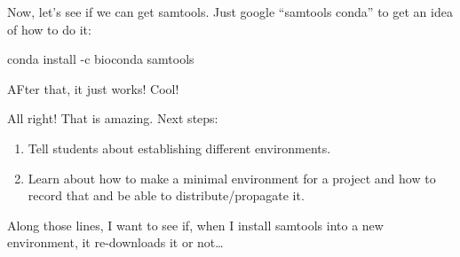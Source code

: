 \documentclass[]{krantz}
\makeatletter
\newenvironment{Shaded}{\begin{snugshade}}{\end{snugshade}}
\newcommand{\ExtensionTok}[1]{#1}
\newcommand{\KeywordTok}[1]{\textcolor[rgb]{0.27,0.27,0.27}{\textbf{#1}}}
\newcommand{\NormalTok}[1]{#1}
\newcommand{\OperatorTok}[1]{\textcolor[rgb]{0.43,0.43,0.43}{\textbf{#1}}}
\providecommand{\tightlist}{%
  \setlength{\itemsep}{0pt}\setlength{\parskip}{0pt}}
\newenvironment{kframe}{%
\medskip{}
\setlength{\fboxsep}{.8em}
 \def\at@end@of@kframe{}%
 \ifinner\ifhmode%
  \def\at@end@of@kframe{\end{minipage}}%
  \begin{minipage}{\columnwidth}%
 \fi\fi%
 \def\FrameCommand##1{\hskip\@totalleftmargin \hskip-\fboxsep
 \colorbox{shadecolor}{##1}\hskip-\fboxsep
     \hskip-\linewidth \hskip-\@totalleftmargin \hskip\columnwidth}%
 \MakeFramed {\advance\hsize-\width
   \@totalleftmargin\z@ \linewidth\hsize
   \@setminipage}}%
 {\par\unskip\endMakeFramed%
 \at@end@of@kframe}
\renewenvironment{Shaded}{\begin{kframe}}{\end{kframe}}
\makeatother
\begin{document}
Now, let's see if we can get samtools. Just google ``samtools conda'' to
get an idea of how to do it:

\begin{Shaded}
\begin{Highlighting}[]
\ExtensionTok{conda}\NormalTok{ install -c bioconda samtools}
\end{Highlighting}
\end{Shaded}

AFter that, it just works! Cool!

\begin{Shaded}
\end{Shaded}

All right! That is amazing. Next steps:

\begin{enumerate}
\def\labelenumi{\arabic{enumi}.}
\tightlist
\item
  Tell students about establishing different environments.
\item
  Learn about how to make a minimal environment for a project and how to
  record that and be able to distribute/propagate it.
\end{enumerate}

Along those lines, I want to see if, when I install samtools into a new environment,
it re-downloads it or not\ldots{}
\end{document}
